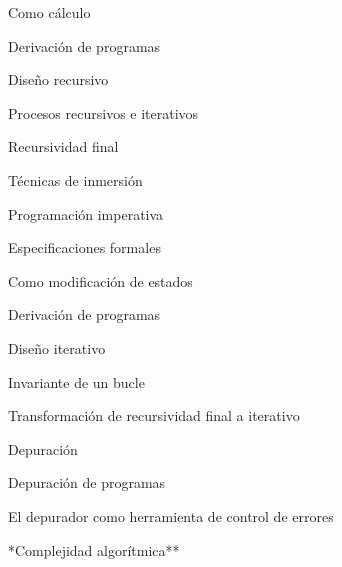 \begin{longenum}
\begin{longenum}
\begin{longenum}
            \begin{longenum}
                \item Como cálculo
            \end{longenum}
            \item Derivación de programas
            \begin{longenum}
                \item Diseño recursivo
                \begin{longenum}
                    \item Procesos recursivos e iterativos
                    \item Recursividad final
                    \item Técnicas de inmersión
                \end{longenum}
            \end{longenum}
        \end{longenum}
        \item Programación imperativa
        \begin{longenum}
            \item Especificaciones formales
            \begin{longenum}
                \item Como modificación de estados
            \end{longenum}
            \item Derivación de programas
            \begin{longenum}
                \item Diseño iterativo
                \begin{longenum}
                    \item Invariante de un bucle
                    \item Transformación de recursividad final a iterativo
                \end{longenum}
            \end{longenum}
        \end{longenum}
        \item Depuración
        \begin{longenum}
            \item Depuración de programas
            \item El depurador como herramienta de control de errores
        \end{longenum}
    \end{longenum}
    \item **Complejidad algorítmica**

\end{longenum}
